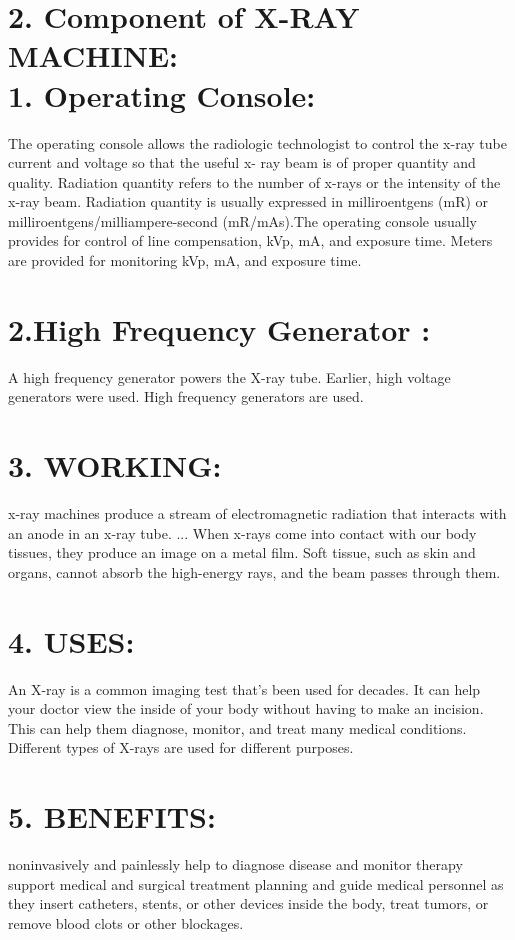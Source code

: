 \documentclass[12pt]{article}
\begin{document}
\section*{2.  Component of X-RAY MACHINE:\\1. Operating Console:}
 The operating console allows the radiologic technologist to control the x-ray tube current and voltage so that the useful x- ray beam is of proper quantity and quality. Radiation quantity refers to the number of x-rays or the intensity of the x-ray beam. Radiation quantity is usually expressed in milliroentgens (mR) or milliroentgens/milliampere-second (mR/mAs).The operating console usually provides for control of line compensation, kVp, mA, and exposure time. Meters are provided for monitoring kVp, mA, and exposure time.
 
\section*{2.High Frequency Generator :}
 A high frequency generator powers the X-ray tube. Earlier, high voltage generators were used. High frequency generators are used.
 
 \section*{3.  WORKING:}
  x-ray machines produce a stream of electromagnetic radiation that interacts with an anode in an x-ray tube. ... When x-rays come into contact with our body tissues, they produce an image on a metal film. Soft tissue, such as skin and organs, cannot absorb the high-energy rays, and the beam passes through them.
  
\section*{4.   USES:}
 An X-ray is a common imaging test that's been used for decades. It can help your doctor view the inside of your body without having to make an incision. This can help them diagnose, monitor, and treat many medical conditions. Different types of X-rays are used for different purposes.
 
 
 \section*{5. BENEFITS:}
 noninvasively and painlessly help to diagnose disease and monitor therapy
support medical and surgical treatment planning and
guide medical personnel as they insert catheters, stents, or other devices inside the body, treat tumors, or remove blood clots or other blockages.
\end{document}
